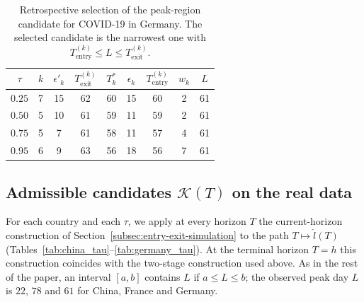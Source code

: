 \documentclass[12pt,a4paper]{article}
\begin{document}
\begin{table}[htbp]
	\centering
	\caption{Retrospective selection of the peak-region candidate for
		COVID-19 in Germany.
		The selected candidate is the narrowest one with
		$T_{\mathrm{entry}}^{(k)}\le L\le T_{\mathrm{exit}}^{(k)}$.}
	\label{tab:germany_entry_exit}
	\begin{tabular}{c|cccccccc}
		\toprule
		$\tau$ &
		$k$ &
		$\epsilon'_k$ &
		$T_{\mathrm{exit}}^{(k)}$ &
		$T_k^*$ &
		$\epsilon_k$ &
		$T_{\mathrm{entry}}^{(k)}$ &
		$w_k$ &
		$L$ \\
		\midrule
		$0.25$ & 7 & 15 & 62 & 60 & 15 & 60 & 2 & 61 \\
		$0.50$ & 5 & 10 & 61 & 59 & 11 & 59 & 2 & 61 \\
		$0.75$ & 5 & 7 & 61 & 58 & 11 & 57 & 4 & 61 \\
		$0.95$ & 6 & 9  & 63 & 56 & 18 & 56 & 7 & 61 \\
		\bottomrule
	\end{tabular}
\end{table}


\subsection{Admissible candidates $\mathcal K(T)$ on the real data}
\label{subsec:real-K}

For each country and each $\tau$, we apply at every horizon $T$ the
current-horizon construction of Section~\ref{subsec:entry-exit-simulation}
to the path $T\mapsto\hat l(T)$ (Tables~\ref{tab:china_tau}--\ref{tab:germany_tau}).
At the terminal horizon $T=h$ this construction coincides with the
two-stage construction used above. As in the rest of the paper, an
interval $[a,b]$ contains $L$ if $a\le L\le b$; the observed peak day $L$
is $22$, $78$ and $61$ for China, France and Germany.
\end{document}
